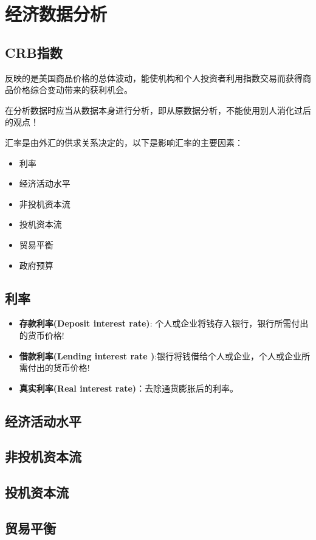 \chapter{经济数据分析}

\section{CRB指数}

反映的是美国商品价格的总体波动，能使机构和个人投资者利用指数交易而获得商品价格综合变动带来的获利机会。


在分析数据时应当从数据本身进行分析，即从原数据分析，不能使用别人消化过后的观点！

汇率是由外汇的供求关系决定的，以下是影响汇率的主要因素：
\begin{itemize}
\item 利率
\item 经济活动水平
\item 非投机资本流
\item 投机资本流
\item 贸易平衡
\item 政府预算
\end{itemize}

\section{利率}

\begin{itemize}
\item \textbf{存款利率(Deposit interest rate)}: 个人或企业将钱存入银行，银行所需付出的货币价格!
\item \textbf{借款利率(Lending interest rate )}:银行将钱借给个人或企业，个人或企业所需付出的货币价格!
\item \textbf{真实利率(Real interest rate)}：去除通货膨胀后的利率。
\end{itemize}

\section{经济活动水平}
\section{非投机资本流}
\section{投机资本流}
\section{贸易平衡}
